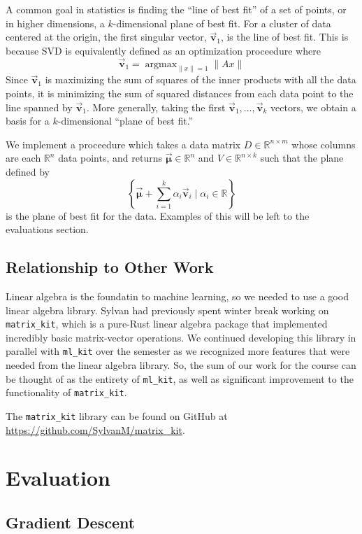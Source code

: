 \documentclass[12pt, letterpaper]{article}
\theoremstyle{definition}
\theoremstyle{remark}
\newcommand{\vect}[1]{\vec{\mathbf{#1}}}
\newcommand{\R}{\mathbb{R}}
\DeclareMathOperator*{\argmax}{argmax}
\begin{document}
A common goal in statistics is finding the ``line of best fit'' of a set of points, or in higher dimensions,
a $k$-dimensional plane of best fit. For a cluster of data centered at the origin, the first singular vector, $\vect v_1$,
is the line of best fit. This is because SVD is equivalently defined as an optimization proceedure where 
\[
    \vect v_1 = \argmax_{\|x\| = 1} \|Ax\|
\]
Since $\vect v_1$ is maximizing the sum of squares of the inner products with all the data points, it is minimizing 
the sum of squared distances from each data point to the line spanned by $\vect v_1$. More generally, taking the first 
$\vect v_1, \ldots, \vect v_k$ vectors, we obtain a basis for a $k$-dimensional ``plane of best fit.'' 

We implement a proceedure which takes a data matrix $D \in \R^{n \times m}$ whose columns are each $\R^n$ data points, 
and returns $\vect \mu \in \R^n$ and $V \in \R^{n \times k}$ such that the plane defined by 
\[
    \left\{\vect \mu + \sum_{i = 1}^{k} \alpha_i \vect v_i \mid \alpha_i \in \R\right\}
\]
is the plane of best fit for the data. Examples of this will be left to the evaluations section.

\subsection{Relationship to Other Work}

Linear algebra is the foundatin to machine learning, so we needed to use a good linear algebra library. Sylvan had 
previously spent winter break working on \texttt{matrix\_kit}, which is a pure-Rust linear algebra package that 
implemented incredibly basic matrix-vector operations. We continued developing this library in parallel with 
\texttt{ml\_kit} over the semester as we recognized more features that were needed from the linear algebra library. 
So, the sum of our work for the course can be thought of as the entirety of \texttt{ml\_kit}, as well as significant
improvement to the functionality of \texttt{matrix\_kit}.

The \texttt{matrix\_kit} library can be found on GitHub at \url{https://github.com/SylvanM/matrix_kit}.

\section{Evaluation}

\subsection{Gradient Descent}
\end{document}
